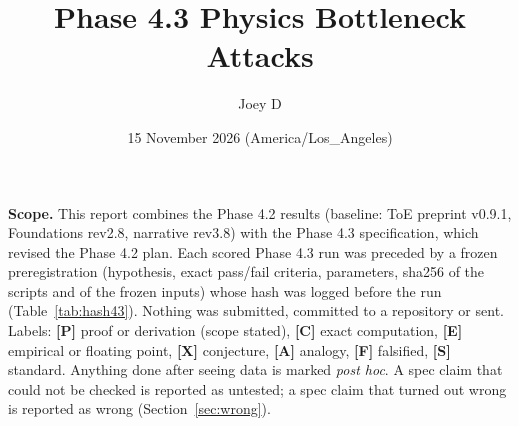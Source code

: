 \documentclass[10pt]{article}
\title{Phase 4.3 Physics Bottleneck Attacks}
\author{Joey D}
\date{15 November 2026 (America/Los\_Angeles)}
\newcommand{\lab}[1]{\textbf{[#1]}}
\begin{document}
\maketitle
\noindent\textbf{Scope.} This report combines the Phase 4.2 results (baseline: ToE preprint v0.9.1, Foundations rev2.8, narrative rev3.8) with the Phase 4.3 specification, which revised the Phase 4.2 plan. Each scored Phase 4.3 run was preceded by a frozen preregistration (hypothesis, exact pass/fail criteria, parameters, sha256 of the scripts and of the frozen inputs) whose hash was logged before the run (Table~\ref{tab:hash43}). Nothing was submitted, committed to a repository or sent. Labels: \lab{P} proof or derivation (scope stated), \lab{C} exact computation, \lab{E} empirical or floating point, \lab{X} conjecture, \lab{A} analogy, \lab{F} falsified, \lab{S} standard. Anything done after seeing data is marked \emph{post hoc}. A spec claim that could not be checked is reported as untested; a spec claim that turned out wrong is reported as wrong (Section~\ref{sec:wrong}).
\end{document}
